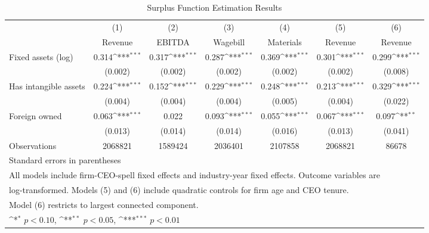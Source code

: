 \begin{table}[htbp]\centering
\def\sym#1{\ifmmode^{#1}\else\(^{#1}\)\fi}
\caption{Surplus Function Estimation Results}
\begin{tabular}{l*{6}{c}}
\toprule
                    &\multicolumn{1}{c}{(1)}&\multicolumn{1}{c}{(2)}&\multicolumn{1}{c}{(3)}&\multicolumn{1}{c}{(4)}&\multicolumn{1}{c}{(5)}&\multicolumn{1}{c}{(6)}\\
                    &\multicolumn{1}{c}{Revenue}&\multicolumn{1}{c}{EBITDA}&\multicolumn{1}{c}{Wagebill}&\multicolumn{1}{c}{Materials}&\multicolumn{1}{c}{Revenue}&\multicolumn{1}{c}{Revenue}\\
\midrule
Fixed assets (log)  &       0.314\sym{***}&       0.317\sym{***}&       0.287\sym{***}&       0.369\sym{***}&       0.301\sym{***}&       0.299\sym{***}\\
                    &     (0.002)         &     (0.002)         &     (0.002)         &     (0.002)         &     (0.002)         &     (0.008)         \\
\addlinespace
Has intangible assets&       0.224\sym{***}&       0.152\sym{***}&       0.229\sym{***}&       0.248\sym{***}&       0.213\sym{***}&       0.329\sym{***}\\
                    &     (0.004)         &     (0.004)         &     (0.004)         &     (0.005)         &     (0.004)         &     (0.022)         \\
\addlinespace
Foreign owned       &       0.063\sym{***}&       0.022         &       0.093\sym{***}&       0.055\sym{***}&       0.067\sym{***}&       0.097\sym{**} \\
                    &     (0.013)         &     (0.014)         &     (0.014)         &     (0.016)         &     (0.013)         &     (0.041)         \\
\midrule
Observations        &     2068821         &     1589424         &     2036401         &     2107858         &     2068821         &       86678         \\
\bottomrule
\multicolumn{7}{l}{\footnotesize Standard errors in parentheses}\\
\multicolumn{7}{l}{\footnotesize All models include firm-CEO-spell fixed effects and industry-year fixed effects. Outcome variables are}\\
\multicolumn{7}{l}{\footnotesize log-transformed. Models (5) and (6) include quadratic controls for firm age and CEO tenure.}\\
\multicolumn{7}{l}{\footnotesize Model (6) restricts to largest connected component.}\\
\multicolumn{7}{l}{\footnotesize \sym{*} \(p<0.10\), \sym{**} \(p<0.05\), \sym{***} \(p<0.01\)}\\
\end{tabular}
\end{table}
